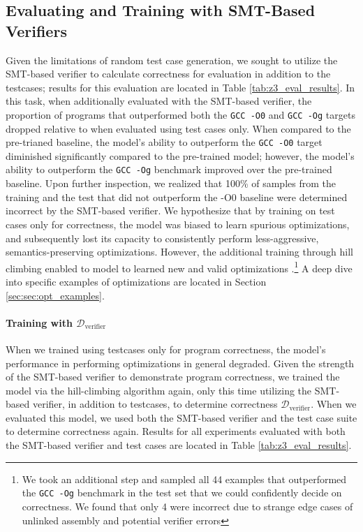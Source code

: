 \documentclass{article}
\def\correctfuncsmt/{\ensuremath{\mathcal{D}_\textrm{verifier}}}
\begin{document}
\subsection{Evaluating and Training with SMT-Based Verifiers}
\label{sec:sec:results:training_with_smt}

Given the limitations of random test case generation, we sought to utilize the SMT-based verifier to calculate correctness for evaluation in addition to the testcases; results for this evaluation are located in Table \ref{tab:z3_eval_results}. In this task, when additionally evaluated with the SMT-based verifier, the proportion of programs that outperformed both the \texttt{GCC -O0} and \texttt{GCC -Og} targets dropped relative to when evaluated using test cases only. When compared to the pre-trianed baseline, the model's ability to outperform the \texttt{GCC -O0} target diminished significantly compared to the pre-trained model; however, the model's ability to outperform the \texttt{GCC -Og} benchmark improved over the pre-trained baseline.  Upon further inspection, we realized that 100\% of samples from the training and the test that did not outperform the -O0 baseline were determined incorrect by the SMT-based verifier. We hypothesize that by training on test cases only for correctness, the model was biased to learn spurious optimizations, and subsequently lost its capacity to consistently perform less-aggressive, semantics-preserving optimizations. However, the additional training through hill climbing enabled to model to learned new and valid optimizations .\footnote{We took an additional step and sampled all 44 examples that outperformed the \texttt{GCC -Og} benchmark in the test set that we could confidently decide on correctness. We found that only 4 were incorrect due to strange edge cases of unlinked assembly and potential verifier errors} A deep dive into specific examples of optimizations are located in Section \ref{sec:sec:opt_examples}. 


\paragraph{Training with \correctfuncsmt/} When we trained using testcases only for program correctness, the model's performance in performing optimizations in general degraded. Given the strength of the SMT-based verifier to demonstrate program correctness, we trained the model via the hill-climbing algorithm again, only this time utilizing the SMT-based verifier, in addition to testcases, to determine correctness \correctfuncsmt/. When we evaluated this model, we used both the SMT-based verifier and the test case suite to determine correctness again. Results for all experiments evaluated with both the SMT-based verifier and test cases are located in Table \ref{tab:z3_eval_results}. 
\end{document}
